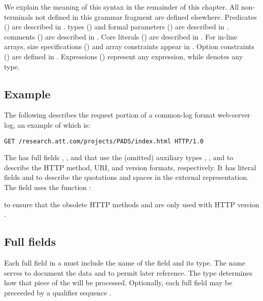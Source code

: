 \noindent
We explain the meaning of this syntax in the remainder of this chapter.
All non-terminals not defined in this grammar fragment are defined elsewhere.
Predicates () are described in .
\padsl{} types () and formal parameters ()
are described in .
\PADS{} comments () are described in .
Core literals ()  are described in
.
For in-line arrays, size specifications () and array constraints 
appear in .
Option constraints () are defined in .
Expressions () represent any \C{} expression, 
while  denotes any \C{} type.


\subsection{Example}
The following \Pstruct{} describes the request portion of a
common-log format web-server log, an example of which is:
\begin{center}
\begin{verbatim}
GET /research.att.com/projects/PADS/index.html HTTP/1.0
\end{verbatim}
\end{center}
%
\noindent
The \Pstruct{}  has full fields ,
, and  that use the (omitted) auxiliary types
,
, and
 to describe
the HTTP method, URI, and  version formats, respectively.  
It has literal fields  and
 to describe the quotations and spaces in the external
representation. 
The  field uses the \C{}
function :

%
\noindent
to ensure that the obsolete HTTP methods
 and  are only used with HTTP version .


\subsection{Full fields}
\label{sec:structs-full-fields}
Each full field in a \Pstruct{} must include the name of the field
and its type.  
The name serves to document the data and to permit later reference.  
The type determines how that piece of the \Pstruct{} will be
processed.  
Optionally, each full field may be preceeded by a qualifier sequence
\cf{} .  

